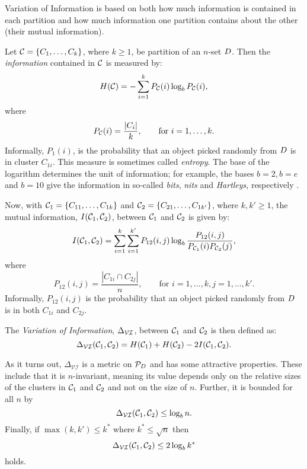 Variation of Information is based on both how much information is contained in
each partition and how much information one partition contains about the other
(their mutual information).

Let $\mathcal{C} = \{C_{1},\dotsc,C_{k}\}$, where $k \geq 1$, be partition of an
$n$-set $D$.  Then the \textit{information} contained in $\mathcal{C}$ is
measured by:
\begin{equation}
  \label{eq:entropy}
  H(\mathcal{C}) = -\sum_{i=1}^{k} P_{\mathcal{C}}(i) \log_b P_{\mathcal{C}}(i),
\end{equation}
where
\begin{equation*}
  P_{\mathcal{C}}(i) = \frac{|C_{i}|}{k}, \qquad \text{for $i = 1,\dotsc,k$}.
\end{equation*}
Informally, $P_1(i)$, is the probability that an object picked randomly from
$D$ is in cluster $C_{1i}$.  This measure is sometimes called
\textit{entropy}.  The base of the logarithm determines the unit of
information; for example, the bases $b=2,b=e$ and $b=10$ give the information
in so-called \textit{bits}, \textit{nits} and \textit{Hartleys}, respectively
\citep[see][]{kullback68information}.

Now, with $\mathcal{C}_1 = \{C_{11},\dotsc,C_{1k}\}$ and $\mathcal{C}_2 =
\{C_{21},\dotsc,C_{1k'}\}$, where $k,k' \geq 1$, the mutual information,
$I(\mathcal{C}_1,\mathcal{C}_2)$, between $\mathcal{C}_1$ and $\mathcal{C}_2$ is given by:
\begin{equation}
  \label{eq:mutualinf}
  I(\mathcal{C}_1,\mathcal{C}_2) = \sum_{i=1}^{k} \sum_{i=1}^{k'}
  P_{12}(i,j) \log_b \frac{P_{12}(i,j)}{P_{\mathcal{C}_1}(i)P_{\mathcal{C}_2}(j)},
\end{equation}
where
\begin{equation*}
  P_{12}(i,j) = \frac{|C_{1i} \cap C_{2j}|}{n}, \qquad \text{for $i =
    1,\dotsc,k,j = 1,\dotsc,k'$}.
\end{equation*}
Informally, $P_{12}(i,j)$ is the probability that an object picked randomly
from $D$ is in both $C_{1i}$ and $C_{2j}$.

The \textit{Variation of Information}, $\Delta_{\mathcal{VI}}$, between $\mathcal{C}_1$
and $\mathcal{C}_2$ is then defined as:
\begin{equation*}
  \Delta_{\mathcal{VI}}(\mathcal{C}_1,\mathcal{C}_2) = H(\mathcal{C}_1) + H(\mathcal{C}_2) - 2I(\mathcal{C}_1,\mathcal{C}_2).
\end{equation*}

As it turns out, $\Delta_{\mathcal{VI}}$ is a metric on $\mathcal{P}_{D}$ and
has some attractive properties.  These include that it is $n$-invariant,
meaning its value depends only on the relative sizes of the clusters in
$\mathcal{C}_1$ and $\mathcal{C}_2$ and not on the size of $n$.  Further, it is bounded
for all $n$ by
\begin{equation*}
  \Delta_{\mathcal{VI}}(\mathcal{C}_1,\mathcal{C}_2) \leq \log_b n.
\end{equation*}
Finally, if $\max(k,k') \leq k^*$ where $k^* \leq \sqrt{n}$ then
\begin{equation*}
  \Delta_{\mathcal{VI}}(\mathcal{C}_1,\mathcal{C}_2) \leq 2 \log_b k^*
\end{equation*}
holds.

